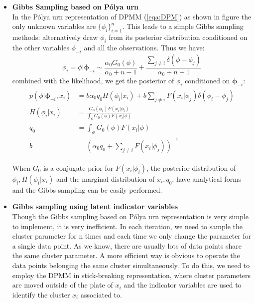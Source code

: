 	 \begin{itemize}
	 	\item \textbf{Gibbs Sampling based on P\'{o}lya urn} \\
	 	In the P\'{o}lya urn representation of DPMM (\ref{eqa:DPM}) as shown in figure the only unknown variables are $\{\phi_i\}_{i=1}^n$. This leads to a simple Gibbs sampling methods: alternatively draw $\phi_i$ from its posterior distribution conditioned on the other variables $\phi_{-i}$ and all the observations. Thus we have:
	 	\begin{equation}
	 		\phi_i=\phi|\mathbf{\phi}_{-i}	\sim \frac{\alpha_0G_0(\phi)}{\alpha_0+n-1}+\frac{\sum_{j\neq i}\delta(\phi-\phi_j)}{\alpha_0+n-1}
	 	\end{equation}
	 	combined with the likelihood, we get the posterior of $\phi_i$ conditioned on $\mathbf{\phi}_{-i}$:
	 	\begin{eqnarray}
	 	    \begin{split}
	 	    p(\phi|\mathbf{\phi}_{-i},x_i)&= b\alpha_0q_0H(\phi_i|x_i)+b\sum_{j\neq i}F(x_i|\phi_j)\delta(\phi_i-\phi_j)\\
	 	    H(\phi_i|x_i)&=\frac{G_0(\phi_i)F(x_i|\phi_i)}{\int_{\phi}G_0(\phi)F(x_i|\phi)}\\
	 	    q_0&=\int_{\phi}G_0(\phi)F(x_i|\phi)\\
	 	    b&=\left(\alpha_0q_0+\sum_{j\neq i}F(x_i|\phi_j)\right)^{-1}
	 	    \end{split}
	 	\end{eqnarray}
	 
	 	When $G_0$ is a conjugate prior for $F(x_i|\phi_i)$, the posterior distribution of $\phi_i, H(\phi_i|x_i)$ and the marginal distribution of $x_i, q_0$, have analytical forms and the Gibbs sampling can be easily performed.
	 	
	 	\item \textbf{Gibbs sampling using latent indicator variables}\\
	 	Though the Gibbs sampling based on P\'{o}lya urn representation is very simple to implement, it is very inefficient. In each iteration, we need to sample the cluster parameter for n times and each time we only change the parameter for a single data point. As we know, there are usually lots of data points share the same cluster parameter. A more efficient way is obvious to operate the data points belonging the same cluster simultaneously. To do this, we need to employ the DPMM in stick-breaking representation, where cluster parameters are moved outside of the plate of $x_i$ and the indicator variables are used to identify the cluster $x_i$ associated to.
	 	

\end{itemize}
